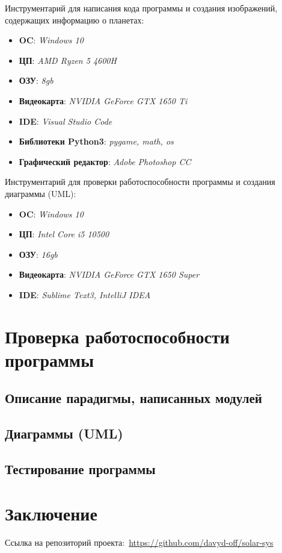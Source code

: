 \documentclass[14pt, oneside]{altsu-report}
\begin{document}
Инструментарий для написания кода программы и создания изображений, содержащих информацию о планетах:
    \begin{itemize}
        \item \textbf{OC}: \textit{Windows 10}
        \item \textbf{ЦП}: \textit{AMD Ryzen 5 4600H}
        \item \textbf{ОЗУ}: \textit{8gb}
        \item \textbf{Видеокарта}: \textit{NVIDIA GeForce GTX 1650 Ti}
        \item \textbf{IDE}: \textit{Visual Studio Code}
        \item \textbf{Библиотеки Python3}: \textit{pygame, math, os}
        \item \textbf{Графический редактор}: \textit{Adobe Photoshop CC}
    \end{itemize}

Инструментарий для проверки работоспособности программы и создания диаграммы (UML):
    \begin{itemize}
        \item \textbf{OC}: \textit{Windows 10}
        \item \textbf{ЦП}: \textit{Intel Core i5 10500}
        \item \textbf{ОЗУ}: \textit{16gb}
        \item \textbf{Видеокарта}: \textit{NVIDIA GeForce GTX 1650 Super}
        \item \textbf{IDE}: \textit{Sublime Text3, IntelliJ IDEA}
    \end{itemize}


\chapter{Проверка работоспособности программы}\label{ch2}
\section{Описание парадигмы, написанных модулей}
\section{Диаграммы (UML)}
\section{Тестирование программы}



\chapter*{Заключение}
Ссылка на репозиторий проекта:~\textcolor{blue}{\url{https://github.com/davyd-off/solar-sys}}
\end{document}
